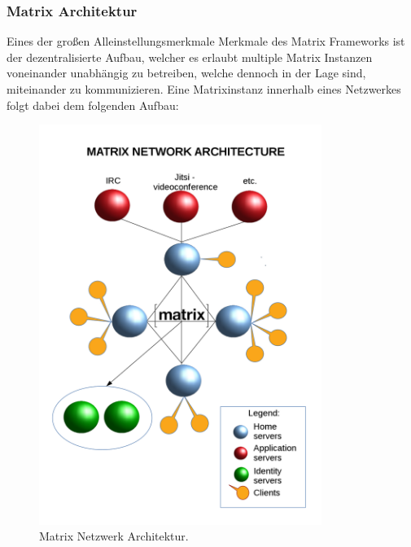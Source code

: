 \subsubsection{Matrix Architektur}\label{chapter:aemn}
Eines der großen Alleinstellungsmerkmale Merkmale des Matrix Frameworks ist der dezentralisierte Aufbau, welcher es erlaubt multiple Matrix Instanzen voneinander unabhängig zu betreiben, welche dennoch in der Lage sind, miteinander zu kommunizieren. Eine Matrixinstanz innerhalb eines Netzwerkes folgt dabei dem folgenden Aufbau:

\begin{figure}[htb]
    \centering
    \includegraphics[height=13cm]{graphics/1280px-Diagramme_Matrix_en.png}
    \caption[Matrix Netzwerk Architektur]{Matrix Netzwerk Architektur.\footnotemark}
    \label{abb:DHBWLogo}
\end{figure}

